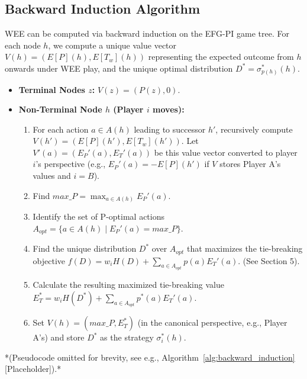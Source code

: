 \documentclass{article}
\begin{document}
\subsection{Backward Induction Algorithm}
WEE can be computed via backward induction on the EFG-PI game tree. For each node $h$, we compute a unique value vector $V(h) = (E[P](h), E[T_w](h))$ representing the expected outcome from $h$ onwards under WEE play, and the unique optimal distribution $D^* = \sigma_{p(h)}^*(h)$.
\begin{itemize}
    \item \textbf{Terminal Nodes $z$:} $V(z) = (P(z), 0)$.
    \item \textbf{Non-Terminal Node $h$ (Player $i$ moves):}
        \begin{enumerate}
            \item For each action $a \in A(h)$ leading to successor $h'$, recursively compute $V(h') = (E[P](h'), E[T_w](h'))$. Let $V'(a) = (E_P'(a), E_T'(a))$ be this value vector converted to player $i$'s perspective (e.g., $E_P'(a) = -E[P](h')$ if $V$ stores Player A's values and $i=B$).
            \item Find $max\_P = \max_{a \in A(h)} E_P'(a)$.
            \item Identify the set of P-optimal actions $A_{opt} = \{a \in A(h) \mid E_P'(a) = max\_P\}$.
            \item Find the unique distribution $D^*$ over $A_{opt}$ that maximizes the tie-breaking objective $f(D) = w_i H(D) + \sum_{a \in A_{opt}} p(a) E_T'(a)$. (See Section 5).
            \item Calculate the resulting maximized tie-breaking value $E_T^* = w_i H(D^*) + \sum_{a \in A_{opt}} p^*(a) E_T'(a)$.
            \item Set $V(h) = (max\_P, E_T^*)$ (in the canonical perspective, e.g., Player A's) and store $D^*$ as the strategy $\sigma_i^*(h)$.
        \end{enumerate}
\end{itemize}
*(Pseudocode omitted for brevity, see e.g., Algorithm~\ref{alg:backward_induction} [Placeholder]).*
\end{document}
